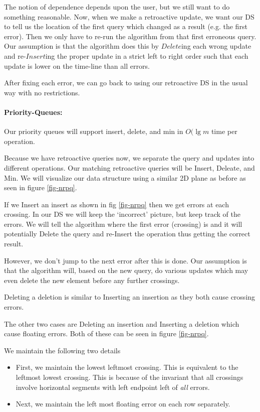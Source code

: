 \documentclass[11pt]{article}
\begin{document}
The notion of dependence depends upon the user, but we still want to do something reasonable.  Now, when we make a retroactive update, we want our DS to tell us the location of the first query which changed as a result (e.g. the first error).  Then we only have to re-run the algorithm from that first erroneous query.  Our assumption is that the algorithm does this by $Delete$ing each wrong update and re-$Insert$ing the proper update in a strict left to right order such that each update is lower on the time-line than all errors.

After fixing each error, we can go back to using our retroactive DS in the usual way with no restrictions.

\paragraph{Priority-Queues:} Our priority queues will support insert, delete, and min in $O(\lg m$ time per operation.

Because we have retroactive queries now, we separate the query and updates into different operations.  Our matching retroactive queries will be Insert, Deleate, and Min.  We will visualize our data structure using a similar 2D plane as before as seen in figure \ref{fig-nrpq}.

If we Insert an insert as shown in fig \ref{fig-nrpq} then we get errors at each crossing.  In our DS we will keep the `incorrect' picture, but keep track of the errors.  We will tell the algorithm where the first error (crossing) is and it will potentially Delete the query and re-Insert the operation thus getting the correct result.

However, we don't jump to the next error after this is done. Our assumption is that the algorithm will, based on the new query, do various updates which may even delete the new element before any further crossings.

Deleting a deletion is similar to Inserting an insertion as they both cause crossing errors.

The other two cases are Deleting an insertion and Inserting a deletion which cause floating errors.  Both of these can be seen in figure \ref{fig-nrpq}.

We maintain the following two details

\begin{itemize}
\item First, we maintain the lowest leftmost crossing. This is equivalent to the leftmost lowest crossing. This is because of the invariant that all crossings involve horizontal segments with left endpoint left of \emph{all} errors.
\item Next, we maintain the left most floating error on each row separately.
\end{itemize}
\end{document}

